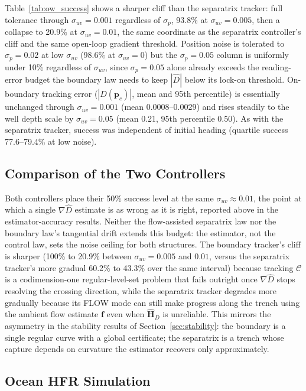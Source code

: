 \documentclass[12pt, letterpaper, oneside]{report}
\begin{document}
Table~\ref{tab:ow_success} shows a sharper cliff than the separatrix
tracker: full tolerance through $\sigma_{uv} = 0.001$ regardless of
$\sigma_p$, 93.8\% at $\sigma_{uv} = 0.005$, then a collapse to 20.9\%
at $\sigma_{uv} = 0.01$, the same coordinate as the separatrix
controller's cliff and the same open-loop gradient threshold. Position
noise is tolerated to $\sigma_p = 0.02$ at low $\sigma_{uv}$ (98.6\% at
$\sigma_{uv} = 0$) but the $\sigma_p = 0.05$ column is uniformly under
10\% regardless of $\sigma_{uv}$, since $\sigma_p = 0.05$ alone already
exceeds the reading-error budget the boundary law needs to keep
$|\hat{D}|$ below its lock-on threshold. On-boundary tracking error
($|D(\mathbf{p}_c)|$, mean and 95th percentile) is essentially unchanged
through $\sigma_{uv} = 0.001$ (mean 0.0008--0.0029) and rises steadily
to the well depth scale by $\sigma_{uv} = 0.05$ (mean 0.21, 95th
percentile 0.50). As with the separatrix tracker, success was
independent of initial heading (quartile success 77.6--79.4\% at low
noise).

\subsection{Comparison of the Two Controllers}

Both controllers place their 50\% success level at the same
$\sigma_{uv} \approx 0.01$, the point at which a single
$\nabla\hat{D}$ estimate is as wrong as it is right, reported above in
the estimator-accuracy results. Neither the flow-assisted
separatrix law nor the boundary law's tangential drift extends this
budget: the estimator, not the control law, sets the noise ceiling for
both structures. The boundary tracker's cliff is sharper (100\% to
20.9\% between $\sigma_{uv} = 0.005$ and $0.01$, versus the separatrix
tracker's more gradual 60.2\% to 43.3\% over the same interval) because
tracking $\mathcal{C}$ is a codimension-one regular-level-set problem
that fails outright once $\nabla\hat{D}$ stops resolving the crossing
direction, while the separatrix tracker degrades more gradually because
its FLOW mode can still make progress along the trench using the
ambient flow estimate $\mathbf{f}$ even when $\hat{\mathbf{H}}_D$ is
unreliable. This mirrors the asymmetry in the stability results of
Section~\ref{sec:stability}: the boundary is a single regular curve with
a global certificate; the separatrix is a trench whose capture depends
on curvature the estimator recovers only approximately.

\subsection{Ocean HFR Simulation}
\label{sec:results_ocean}
\end{document}

